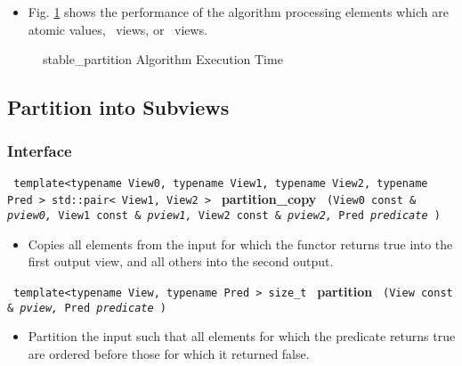 \begin{itemize}
\item
Fig. \ref{fig:stab-part-alg-exec-exper}
shows the performance of the algorithm processing
elements which are atomic values, \stl\ views, or \stapl\ views.
\end{itemize}

\begin{figure}[p]
\caption{stable\_partition Algorithm Execution Time}
\label{fig:stab-part-alg-exec-exper}
\end{figure}


\subsection{Partition into Subviews} \label{sec-reord-part_copy}

\subsubsection{Interface} %

\noindent
\texttt{%
template<typename View0, typename View1, typename View2, typename Pred >
\newline
std::pair< View1, View2 > 
}
\newline
\textbf{partition\_copy}%
\texttt{%
(View0 const \&
\textit{pview0,}%
View1 const \&
\textit{pview1,}%
View2 const \&
\textit{pview2,}%
 Pred 
\textit{predicate}%
)
}

\begin{itemize}
\item
Copies all elements from the input for which the functor returns true into the first output view, and all others into the second output. 
\end{itemize}
 
\noindent
\texttt{%
template<typename View, typename Pred >
\newline
size\_t 
}
\newline
\textbf{partition}%
\texttt{%
(View const \&
\textit{pview,}%
Pred 
\textit{predicate}%
)
}

\begin{itemize}
\item
Partition the input such that all elements for which the predicate returns true are ordered before those for which it returned false. 
\end{itemize}

